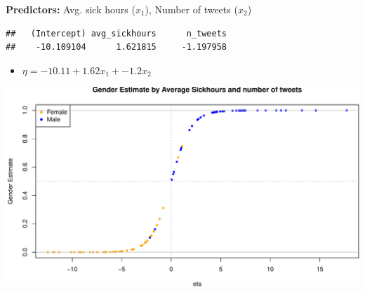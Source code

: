 \documentclass[
  ignorenonframetext,
]{beamer}
\newenvironment{Shaded}{\begin{snugshade}}{\end{snugshade}}
\newcommand{\DataTypeTok}[1]{\textcolor[rgb]{0.13,0.29,0.53}{#1}}
\newcommand{\KeywordTok}[1]{\textcolor[rgb]{0.13,0.29,0.53}{\textbf{#1}}}
\newcommand{\NormalTok}[1]{#1}
\newcommand{\OperatorTok}[1]{\textcolor[rgb]{0.81,0.36,0.00}{\textbf{#1}}}
\newcommand{\StringTok}[1]{\textcolor[rgb]{0.31,0.60,0.02}{#1}}
\providecommand{\tightlist}{%
  \setlength{\itemsep}{0pt}\setlength{\parskip}{0pt}}
\begin{document}
\begin{frame}[fragile]

\textbf{Predictors:} Avg. sick hours (\(x_1\)), Number of tweets
(\(x_2\))

\tiny

\begin{Shaded}
\end{Shaded}

\begin{verbatim}
##   (Intercept) avg_sickhours      n_tweets 
##    -10.109104      1.621815     -1.197958
\end{verbatim}

\normalsize
\tiny\normalsize

\begin{itemize}
\tightlist
\item
  \(\eta= -10.11 + 1.62 x_1 + -1.2 x_2\)
\end{itemize}

\tiny\includegraphics{Schmitt_Marvin_binary_response_files/figure-beamer/unnamed-chunk-8-1.pdf}
\normalsize

\end{frame}
\end{document}
